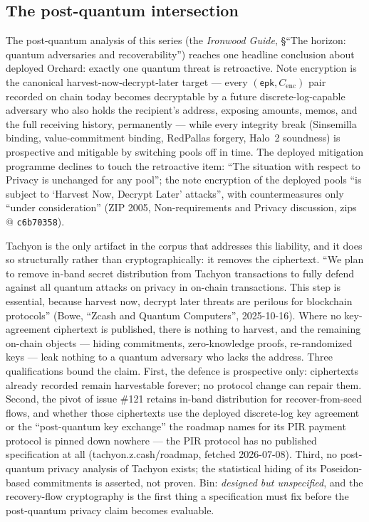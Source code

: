 \documentclass[11pt,a4paper]{article}
\theoremstyle{definition}
\begin{document}
\subsection{The post-quantum intersection}
\label{sec:tachyon-pq-intersection}

The post-quantum analysis of this series (the \emph{Ironwood Guide},
\S``The horizon: quantum adversaries and recoverability'') reaches one headline
conclusion about deployed Orchard: exactly one quantum
threat is retroactive. Note encryption is the canonical
harvest-now-decrypt-later target --- every
$(\mathsf{epk}, C_{\mathrm{enc}})$ pair recorded on chain today becomes
decryptable by a future discrete-log-capable adversary who also holds the
recipient's address, exposing amounts, memos, and the full receiving
history, permanently --- while every integrity break (Sinsemilla binding,
value-commitment binding, RedPallas forgery, Halo~2 soundness) is
prospective and mitigable by switching pools off in time. The deployed
mitigation programme declines to touch the retroactive item: ``The
situation with respect to Privacy is unchanged for any pool''; the note
encryption of the deployed pools ``is subject to `Harvest Now, Decrypt
Later' attacks'', with countermeasures only ``under consideration'' (ZIP
2005, Non-requirements and Privacy discussion, zips @ \texttt{c6b70358}).

Tachyon is the only artifact in the corpus that addresses this liability,
and it does so structurally rather than cryptographically: it removes the
ciphertext. ``We plan to remove in-band secret distribution from Tachyon
transactions to fully defend against all quantum attacks on privacy in
on-chain transactions. This step is essential, because harvest now, decrypt
later threats are perilous for blockchain protocols'' (Bowe, ``Zcash and
Quantum Computers'', 2025-10-16). Where no key-agreement ciphertext is
published, there is nothing to harvest, and the remaining on-chain objects
--- hiding commitments, zero-knowledge proofs, re-randomized keys --- leak
nothing to a quantum adversary who lacks the address. Three qualifications
bound the claim. First, the defence is prospective only: ciphertexts
already recorded remain harvestable forever; no protocol change can repair
them. Second, the pivot of issue \#121 retains in-band distribution for
recover-from-seed flows, and whether those ciphertexts use the deployed
discrete-log key agreement or the ``post-quantum key exchange'' the roadmap
names for its PIR payment protocol is pinned down nowhere --- the PIR
protocol has no published specification at all (tachyon.z.cash/roadmap,
fetched 2026-07-08). Third, no post-quantum privacy analysis of Tachyon
exists; the statistical hiding of its Poseidon-based commitments is
asserted, not proven. Bin: \emph{designed but unspecified}, and the
recovery-flow cryptography is the first thing a specification must fix
before the post-quantum privacy claim becomes evaluable.
\end{document}
